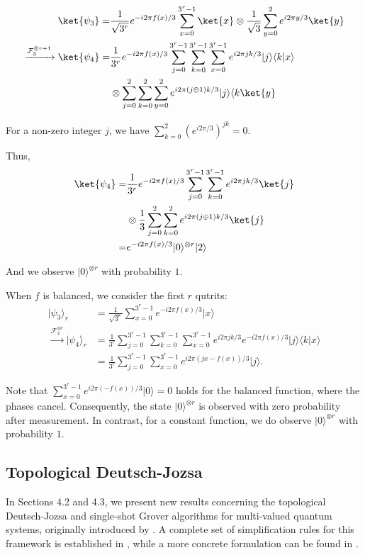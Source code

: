 \documentclass[a4paper,twocolumn,11pt,unpublished]{quantumarticle}
\numberwithin{equation}{section}
\begin{document}
\[
\begin{aligned}
\ket{\psi_{3}}
              =& \frac{1}{\sqrt{3^{r}}} e^{-i2\pi f(x)/3} \sum_{x=0}^{3^{r}-1} \ket{x} \otimes
                \frac{1}{\sqrt{3}} \sum_{y=0}^{2} e^{i2\pi y/3} \ket{y} \\
\xrightarrow{\mathcal{F}_{3}^{\otimes r+1}}
\ket{\psi_{4}} =&
\frac{1}{3^{r}} e^{-i2\pi f(x)/3} \sum_{j=0}^{3^{r}-1} \sum_{k=0}^{3^{r}-1} \sum_{x=0}^{3^{r}-1} e^{i2\pi jk/3} |j\rangle\langle k|x\rangle\\
&\otimes \sum_{j=0}^{2} \sum_{k=0}^{2} \sum_{y=0}^{2} e^{i2\pi(j \oplus 1)k/3} |j\rangle\langle k\ket{y} \\
\end{aligned}
\]

For a non-zero integer $j$, we have
$
\sum_{k=0}^{2} (e^{i2\pi /3})^{j k} = 0
$.

Thus,
\[
\begin{aligned}
\ket{\psi_{4}} =& \frac{1}{3^{r}} e^{-i2\pi f(x)/3} \sum_{j=0}^{3^{r}-1} \sum_{k=0}^{3^{r}-1} e^{i2\pi jk/3} \ket{j} \\
&\otimes
\frac{1}{3} \sum_{j=0}^{2} \sum_{k=0}^{2} e^{i2\pi(j \oplus 1)k/3} \ket{j}\\
=& e^{-i2\pi f(x)/3}|0\rangle^{\otimes r} |2\rangle
\end{aligned}
\]

And we observe $|0\rangle^{\otimes r}$ with probability $1$.

When $f$ is balanced, we consider the first $r$ qutrits:
\[
\begin{aligned}
|\psi_{3}\rangle_r &= \frac{1}{\sqrt{3^{r}}} \sum_{x=0}^{3^{r}-1} e^{-i2\pi f(x)/3} |x\rangle \\
  \xrightarrow{\mathcal{F}_{3}^{\otimes r}}  |\psi_{4}\rangle_r
& =  \displaystyle \frac{1}{3^{r}} \sum_{j=0}^{3^{r}-1} \sum_{k=0}^{3^{r}-1} \sum_{x=0}^{3^{r}-1} e^{i2\pi jk/3} e^{-i2\pi f(x)/3} |j\rangle \langle k | x \rangle \\
& =  \displaystyle \frac{1}{3^{r}} \sum_{j=0}^{3^{r}-1} \sum_{x=0}^{3^{r}-1} e^{i2\pi (jx - f(x))/3} |j\rangle.
\end{aligned}
\]

Note that $\sum_{x=0}^{3^{r}-1} e^{i2\pi ( - f(x))/3} |0\rangle=0$ holds for the balanced function, where the phases cancel. Consequently, the state $|0\rangle^{\otimes r}$ is observed with zero probability after measurement. In contrast, for a constant function, we do
 observe $|0\rangle^{\otimes r}$
with probability $1$.

\subsection{Topological Deutsch-Jozsa}
In Sections 4.2 and 4.3, we present new results concerning the topological Deutsch-Jozsa and single-shot Grover algorithms for multi-valued quantum systems, originally introduced by \cite{Vic13}. A complete set of simplification rules for this framework is established in \cite{HV19}, while a more concrete formulation can be found in \cite{Ran14}.
\end{document}
